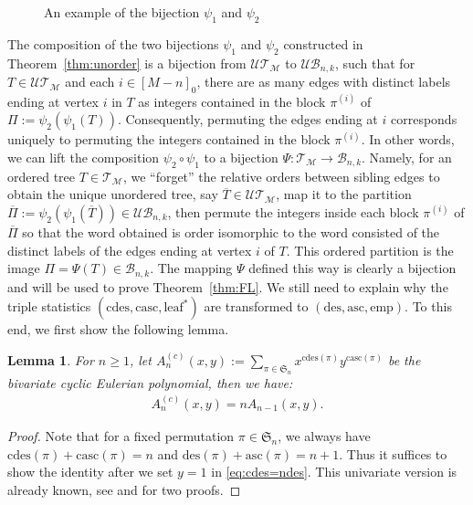 \documentclass[11pt,reqno]{amsart}
\numberwithin{equation}{section}
\theoremstyle{plain}
\newtheorem{lemma}[theorem]{Lemma}
\theoremstyle{definition}
\newcommand{\s}{\mathfrak{S}}
\newcommand{\M}{\mathcal{M}}
\newcommand{\T}{\mathcal{T}}
\newcommand{\B}{\mathcal{B}}
\newcommand{\UT}{\mathcal{UT}}
\newcommand{\UB}{\mathcal{UB}}
\def\des{\mathrm{des}}
\def\asc{\mathrm{asc}}
\def\cdes{\mathrm{cdes}}
\def\casc{\mathrm{casc}}
\def\lleaf{\mathrm{leaf}^*}
\def\emp{\mathrm{emp}}
\begin{document}
\begin{figure}[htb]
\caption{An example of the bijection $\psi_1$ and $\psi_2$}
\label{fig:unordered VE-tree}
\end{figure}

The composition of the two bijections $\psi_1$ and $\psi_2$ constructed in Theorem~\ref{thm:unorder} is a bijection from $\UT_{\M}$ to $\UB_{n,k}$, such that for $T\in\UT_{\M}$ and each $i\in[M-n]_0$, there are as many edges with distinct labels ending at vertex $i$ in $T$ as integers contained in the block $\pi^{(i)}$ of $\Pi:=\psi_2(\psi_1(T))$. Consequently, permuting the edges ending at $i$ corresponds uniquely to permuting the integers contained in the block $\pi^{(i)}$. In other words, we can lift the composition $\psi_2\circ\psi_1$ to a bijection $\Psi:\T_{\M}\rightarrow \B_{n,k}$. Namely, for an ordered tree $T\in\T_{\M}$, we ``forget'' the relative orders between sibling edges to obtain the unique unordered tree, say $\overline{T}\in\UT_{\M}$, map it to the partition $\overline{\Pi}:=\psi_2(\psi_1(\overline{T}))\in\UB_{n,k}$, then permute the integers inside each block $\pi^{(i)}$ of $\overline{\Pi}$ so that the word obtained is order isomorphic to the word consisted of the distinct labels of the edges ending at vertex $i$ of $T$. This ordered partition is the image $\Pi=\Psi(T)\in\B_{n,k}$. The mapping $\Psi$ defined this way is clearly a bijection and will be used to prove Theorem~\ref{thm:FL}. We still need to explain why the triple statistics $(\cdes,\casc,\lleaf)$ are transformed to $(\des,\asc,\emp)$. To this end, we first show the following lemma. 

\begin{lemma}
For $n\ge 1$, let $A_n^{(c)}(x,y):=\sum_{\pi\in\s_n}x^{\cdes(\pi)}y^{\casc(\pi)}$ be the bivariate cyclic Eulerian polynomial, then we have:
\begin{align}\label{eq:cdes=ndes}
A_n^{(c)}(x,y)=nA_{n-1}(x,y).
\end{align}
\end{lemma}
\begin{proof}
Note that for a fixed permutation $\pi\in\s_n$, we always have $\cdes(\pi)+\casc(\pi)=n$ and $\des(\pi)+\asc(\pi)=n+1$. Thus it suffices to show the identity after we set $y=1$ in \eqref{eq:cdes=ndes}. This univariate version is already known, see \cite[Coro.~1]{Ful} and \cite[Prop.~1.1]{Pet} for two proofs. 
\end{proof}
\end{document}

